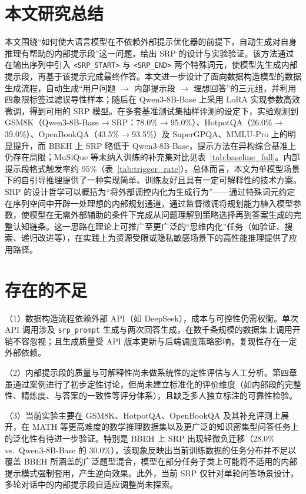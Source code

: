 \section{本文研究总结}

本文围绕“如何使大语言模型在不依赖外部提示优化器的前提下，自动生成对自身推理有帮助的内部提示段”这一问题，给出 SRP 的设计与实验验证。该方法通过在输出序列中引入 \texttt{<SRP\_START>} 与 \texttt{<SRP\_END>} 两个特殊词元，使模型先生成内部提示段，再基于该提示完成最终作答。本文进一步设计了面向数据构造模型的数据生成流程，自动生成“用户问题 $\rightarrow$ 内部提示段 $\rightarrow$ 理想回答”的三元组，并利用四象限标签过滤误导性样本；随后在 Qwen3-8B-Base 上采用 LoRA 实现参数高效微调，得到可用的 SRP 模型。在多套基准测试集抽样评测的设定下，实验观测到 GSM8K（Qwen3-8B-Base$\to$SRP：78.0\%$\to$95.0\%）、HotpotQA（26.0\%$\to$39.0\%）、OpenBookQA（43.5\%$\to$93.5\%）及 SuperGPQA、MMLU-Pro 上的明显提升，而 BBEH 上 SRP 略低于 Qwen3-8B-Base，提示方法在异构综合基准上仍存在局限；MuSiQue 等未纳入训练的补充集对比见表~\ref{tab:baseline_full}。内部提示段格式触发率约 95\%（表~\ref{tab:trigger_rate}）。总体而言，本文为单模型场景下的自引导推理提供了一种实现简单、训练友好且具有一定可解释性的技术方案。SRP 的设计哲学可以概括为“将外部调控内化为生成行为”——通过特殊词元约定在序列空间中开辟一处理想的内部规划通道，通过监督微调将规划能力植入模型参数，使模型在无需外部辅助的条件下完成从问题理解到策略选择再到答案生成的完整认知链条。这一思路在理论上可推广至更广泛的“思维内化”任务（如验证、搜索、递归改进等），在实践上为资源受限或隐私敏感场景下的高性能推理提供了应用路径。

\section{存在的不足}

（1）数据构造流程依赖外部 API（如 DeepSeek），成本与可控性仍需权衡。单次 API 调用涉及 \texttt{srp\_prompt} 生成与两次回答生成，在数千条规模的数据集上调用开销不容忽视；且生成质量受 API 版本更新与后端调度策略影响，复现性存在一定外部依赖。

（2）内部提示段的质量与可解释性尚未做系统性的定性评估与人工分析。第四章虽通过案例进行了初步定性讨论，但尚未建立标准化的评价维度（如内部段的完整性、精炼度、与答案的一致性等评分体系），且缺乏多人独立标注的可靠性检验。

（3）当前实验主要在 GSM8K、HotpotQA、OpenBookQA 及其补充评测上展开，在 MATH 等更高难度的数学推理数据集以及更广泛的知识密集型问答任务上的泛化性有待进一步验证。特别是 BBEH 上 SRP 出现轻微负迁移（28.0\% vs.\ \mbox{Qwen3-8B-Base} 的 30.0\%），该现象反映出当前训练数据的任务分布并不足以覆盖 BBEH 所涵盖的广泛题型混合，模型在部分任务子类上可能将不适用的内部提示模式强制套用，产生逆向效果。此外，当前 SRP 仅针对单轮问答场景设计，多轮对话中的内部提示段自适应调整尚未探索。

